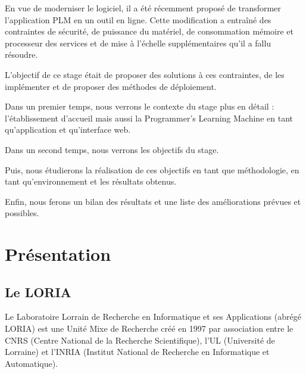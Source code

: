 \documentclass[stage]{tnreport}
\begin{document}
En vue de moderniser le logiciel, il a été récemment proposé de transformer l'application PLM en un outil en ligne. Cette modification a entraîné des contraintes de sécurité, de puissance du matériel, de consommation mémoire et processeur des services et de mise à l'échelle supplémentaires qu'il a fallu résoudre.

L'objectif de ce stage était de proposer des solutions à ces contraintes, de les implémenter et de proposer des méthodes de déploiement.

Dans un premier temps, nous verrons le contexte du stage plus en détail : l'établissement d'accueil mais aussi la Programmer's Learning Machine en tant qu'application et qu'interface web.

Dans un second temps, nous verrons les objectifs du stage.

Puis, nous étudierons la réalisation de ces objectifs en tant que méthodologie, en tant qu'environnement et les résultats obtenus.

Enfin, nous ferons un bilan des résultats et une liste des améliorations prévues et possibles.

\cleardoublepage

\chapter{Présentation}

\section{Le LORIA}

Le Laboratoire Lorrain de Recherche en Informatique et ses Applications (abrégé LORIA\cite{LR-WS}) est une Unité Mixe de Recherche créé en 1997 par association entre le CNRS (Centre National de la Recherche Scientifique), l'UL (Université de Lorraine) et l'INRIA (Institut National de Recherche en Informatique et Automatique).
\end{document}
